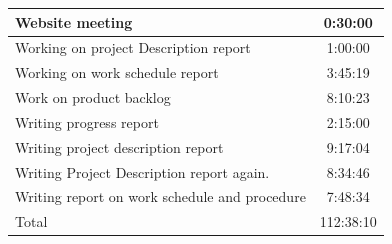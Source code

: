 {\begin{tabular} {| l | c |}
	\hline  Website meeting	&	0:30:00	\\
	\hline  Working on project Description report	&	1:00:00	\\
	\hline  Working on work schedule report	&	3:45:19	\\
	\hline  Work on product backlog	&	8:10:23	\\
	\hline  Writing progress report	&	2:15:00	\\
	\hline  Writing project description report	&	9:17:04	\\
	\hline  Writing Project Description report again.	&	8:34:46	\\
	\hline  Writing report on work schedule and procedure	&	7:48:34	\\
	\hline  Total & 112:38:10 \\

	\hline
\end{tabular}}
\clearpage